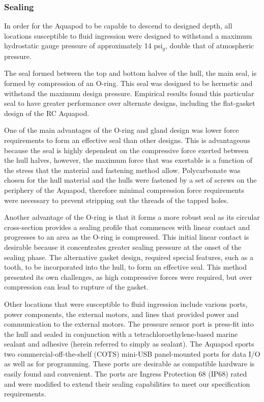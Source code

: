 

	\subsubsection{Sealing}
		In order for the Aquapod to be capable to descend to designed depth, all locations susceptible to fluid ingression were designed to withstand a maximum hydrostatic gauge pressure of approximately 14 psi\(_g\), double that of atmospheric pressure. 
	
		The seal formed between the top and bottom halves of the hull, the main seal, is formed by compression of an O-ring. This seal was designed to be hermetic and withstand the maximum design pressure.  Empirical results found this particular seal to have greater performance over alternate designs, including the flat-gasket design of the RC Aquapod.
            

		One of the main advantages of the O-ring and gland design was lower force requirements to form an effective seal than other designs. This is advantageous because the seal is highly dependent on the compressive force exerted between the hull halves, however, the maximum force that was exertable is a function of the stress that the material and fastening method allow. Polycarbonate was chosen for the hull material and the hulls were fastened by a set of screws on the periphery of the Aquapod, therefore minimal compression force requirements were necessary to prevent stripping out the threads of the tapped holes.

		Another advantage of the O-ring is that it forms a more robust seal as its circular cross-section provides a sealing profile that commences with linear contact and progresses to an area as the O-ring is compressed. This initial linear contact is desirable because it concentrates greater sealing pressure at the onset of the sealing phase. The alternative gasket design, required special features, such as a tooth, to be incorporated into the hull, to form an effective seal.  This method presented its own challenges, as high compressive forces were required, but over compression can lead to rupture of the gasket. 

		Other locations that were susceptible to fluid ingression include various ports, power components, the external motors, and lines that provided power and communication to the external motors. The pressure sensor port is press-fit into the hull and sealed in conjunction with a tetrachloroethylene-based marine sealant and adhesive (herein referred to simply as sealant). The Aquapod sports two commercial-off-the-shelf (COTS) mini-USB panel-mounted ports for data I/O as well as for programming.  These ports are desirable as compatible hardware is easily found and convenient. The ports are Ingress Protection 68 (IP68) rated and were modified to extend their sealing capabilities to meet our specification requirements. 

